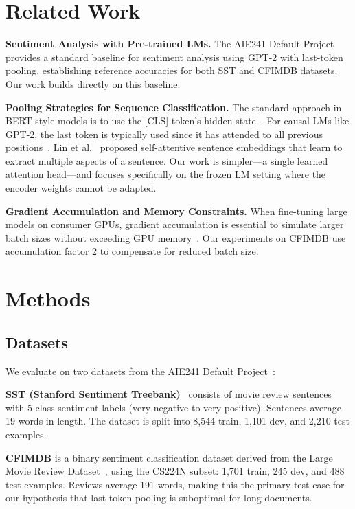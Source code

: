 \documentclass[9pt,twocolumn,twoside,lineno]{gsag3jnl}
\begin{document}
\section{Related Work}

\textbf{Sentiment Analysis with Pre-trained LMs.} The AIE241 Default Project~\citep{cs224n2024} provides a standard baseline for sentiment analysis using GPT-2 with last-token pooling, establishing reference accuracies for both SST and CFIMDB datasets. Our work builds directly on this baseline.

\textbf{Pooling Strategies for Sequence Classification.} The standard approach in BERT-style models is to use the [CLS] token's hidden state~\citep{devlin2019bert}. For causal LMs like GPT-2, the last token is typically used since it has attended to all previous positions~\citep{radford2019language}. Lin et al.~\citep{lin2017structured} proposed self-attentive sentence embeddings that learn to extract multiple aspects of a sentence. Our work is simpler---a single learned attention head---and focuses specifically on the frozen LM setting where the encoder weights cannot be adapted.

\textbf{Gradient Accumulation and Memory Constraints.} When fine-tuning large models on consumer GPUs, gradient accumulation is essential to simulate larger batch sizes without exceeding GPU memory~\citep{radford2019language}. Our experiments on CFIMDB use accumulation factor 2 to compensate for reduced batch size.

\section{Methods}

\subsection{Datasets}

We evaluate on two datasets from the AIE241 Default Project~\citep{cs224n2024}:

\textbf{SST (Stanford Sentiment Treebank)}~\citep{socher2013recursive} consists of movie review sentences with 5-class sentiment labels (very negative to very positive). Sentences average 19 words in length. The dataset is split into 8,544 train, 1,101 dev, and 2,210 test examples.

\textbf{CFIMDB} is a binary sentiment classification dataset derived from the Large Movie Review Dataset~\citep{maas2011learning}, using the CS224N subset: 1,701 train, 245 dev, and 488 test examples. Reviews average 191 words, making this the primary test case for our hypothesis that last-token pooling is suboptimal for long documents.
\end{document}
